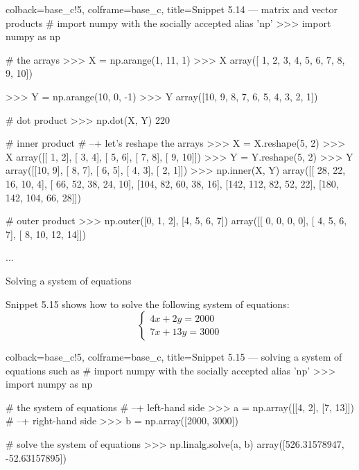 \documentclass[a4paper,11pt]{book}
\numberwithin{figure}{chapter}
\numberwithin{table}{chapter}
\newcommand{\question}[1]{%
    \begin{tcolorbox}[colback=comp_c!10,colframe=comp_c,sidebyside align=top,width=\linewidth,before skip=1ex]
        #1
    \end{tcolorbox}
    \switchcolumn%
}
\newcommand{\note}[1]{%
    \begin{tcolorbox}[colback=white!0,colframe=white!10,width=\linewidth,before skip=1ex]
        #1
    \end{tcolorbox}
}
\begin{document}
\begin{pythoncode}[linenos=true,]{colback=base_c!5, colframe=base_c, title=\sffamily Snippet 5.14 --- matrix and vector products}
# import numpy with the socially accepted alias 'np'
>>> import numpy as np

# the arrays
>>> X = np.arange(1, 11, 1)
>>> X
array([ 1,  2,  3,  4,  5,  6,  7,  8,  9, 10])

>>> Y = np.arange(10, 0, -1)
>>> Y
array([10,  9,  8,  7,  6,  5,  4,  3,  2,  1])

# dot product 
>>> np.dot(X, Y)
220

# inner product
# --+ let's reshape the arrays
>>> X = X.reshape(5, 2)
>>> X
array([[ 1,  2],
       [ 3,  4],
       [ 5,  6],
       [ 7,  8],
       [ 9, 10]])
>>> Y = Y.reshape(5, 2)
>>> Y
array([[10,  9],
       [ 8,  7],
       [ 6,  5],
       [ 4,  3],
       [ 2,  1]])
>>> np.inner(X, Y)
array([[ 28,  22,  16,  10,   4],
       [ 66,  52,  38,  24,  10],
       [104,  82,  60,  38,  16],
       [142, 112,  82,  52,  22],
       [180, 142, 104,  66,  28]])

# outer product
>>> np.outer([0, 1, 2], [4, 5, 6, 7])
array([[ 0,  0,  0,  0],
       [ 4,  5,  6,  7],
       [ 8, 10, 12, 14]])
\end{pythoncode}
...

\begin{paracol}{2}
\question{Solving a system of equations}
\note{Snippet 5.15 shows how to solve the following system of equations:
$$ \left\{
\begin{array}{lr}
4x + 2y = 2000\\
7x + 13y = 3000
\end{array}
\right. $$ 
}
\end{paracol}

\begin{pythoncode}[linenos=true,]{colback=base_c!5, colframe=base_c, title=\sffamily Snippet 5.15 --- solving a system of equations such as}
# import numpy with the socially accepted alias 'np'
>>> import numpy as np

# the system of equations
# --+ left-hand side
>>> a = np.array([[4, 2], [7, 13]])
# --+ right-hand side
>>> b = np.array([2000, 3000])

# solve the system of equations
>>> np.linalg.solve(a, b)
array([526.31578947, -52.63157895])

\end{pythoncode}
\clearpage
\end{document}
